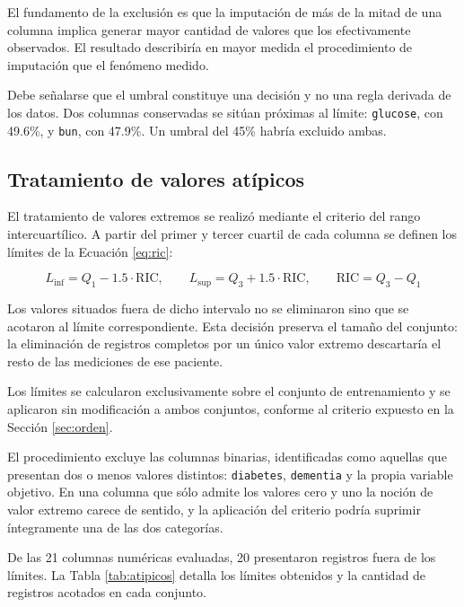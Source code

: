 \documentclass[11pt]{article}
\begin{document}
El fundamento de la exclusión es que la imputación de más de la mitad de una columna implica
generar mayor cantidad de valores que los efectivamente observados. El resultado describiría en
mayor medida el procedimiento de imputación que el fenómeno medido.

Debe señalarse que el umbral constituye una decisión y no una regla derivada de los datos. Dos
columnas conservadas se sitúan próximas al límite: \texttt{glucose}, con 49.6\%, y \texttt{bun},
con 47.9\%. Un umbral del 45\% habría excluido ambas.

\subsection{Tratamiento de valores atípicos}

El tratamiento de valores extremos se realizó mediante el criterio del rango intercuartílico. A
partir del primer y tercer cuartil de cada columna se definen los límites de la
Ecuación \eqref{eq:ric}:

\begin{equation}
L_{\text{inf}} = Q_1 - 1.5 \cdot \text{RIC},
\qquad
L_{\text{sup}} = Q_3 + 1.5 \cdot \text{RIC},
\qquad
\text{RIC} = Q_3 - Q_1
\label{eq:ric}
\end{equation}

Los valores situados fuera de dicho intervalo no se eliminaron sino que se acotaron al límite
correspondiente. Esta decisión preserva el tamaño del conjunto: la eliminación de registros
completos por un único valor extremo descartaría el resto de las mediciones de ese paciente.

Los límites se calcularon exclusivamente sobre el conjunto de entrenamiento y se aplicaron sin
modificación a ambos conjuntos, conforme al criterio expuesto en la Sección \ref{sec:orden}.

El procedimiento excluye las columnas binarias, identificadas como aquellas que presentan dos o
menos valores distintos: \texttt{diabetes}, \texttt{dementia} y la propia variable objetivo. En
una columna que sólo admite los valores cero y uno la noción de valor extremo carece de sentido, y
la aplicación del criterio podría suprimir íntegramente una de las dos categorías.

De las 21 columnas numéricas evaluadas, 20 presentaron registros fuera de los límites. La Tabla
\ref{tab:atipicos} detalla los límites obtenidos y la cantidad de registros acotados en cada
conjunto.


\end{document}
